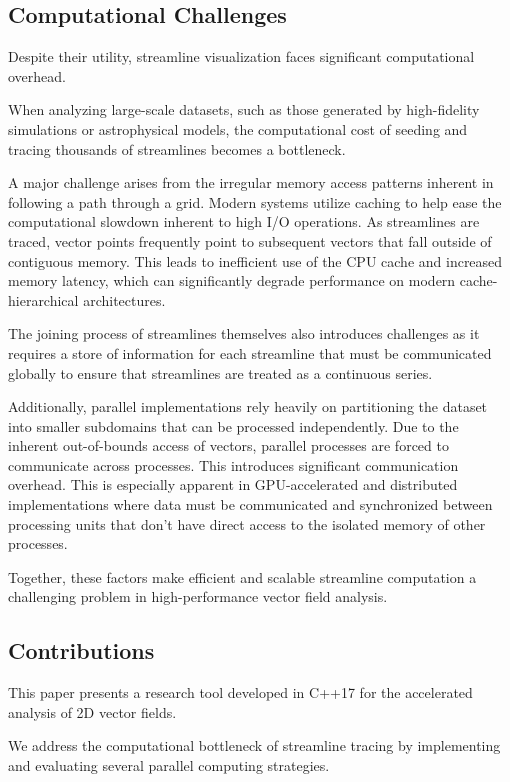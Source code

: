 \subsection{Computational Challenges}

Despite their utility, streamline visualization faces significant computational overhead.

When analyzing large-scale datasets, such as those generated by high-fidelity simulations or astrophysical models, the computational cost of seeding and tracing thousands of streamlines becomes a bottleneck.

A major challenge arises from the irregular memory access patterns inherent in following a path through a grid.
Modern systems utilize caching to help ease the computational slowdown inherent to high I/O operations.
As streamlines are traced, vector points frequently point to subsequent vectors that fall outside of contiguous memory.
This leads to inefficient use of the CPU cache and increased memory latency, which can significantly degrade performance on modern cache-hierarchical architectures.

The joining process of streamlines themselves also introduces challenges as it requires a store of information for each streamline that must be communicated globally to ensure that streamlines are treated as a continuous series.


Additionally, parallel implementations rely heavily on partitioning the dataset into smaller subdomains that can be processed independently.
Due to the inherent out-of-bounds access of vectors, parallel processes are forced to communicate across processes.
This introduces significant communication overhead.
This is especially apparent in GPU-accelerated and distributed implementations where data must be communicated and synchronized between processing units that don't have direct access to the isolated memory of other processes.

Together, these factors make efficient and scalable streamline computation a challenging problem in high-performance vector field analysis.


\subsection{Contributions}

This paper presents a research tool developed in C++17 for the accelerated analysis of 2D vector fields.

We address the computational bottleneck of streamline tracing by implementing and evaluating several parallel computing strategies.


